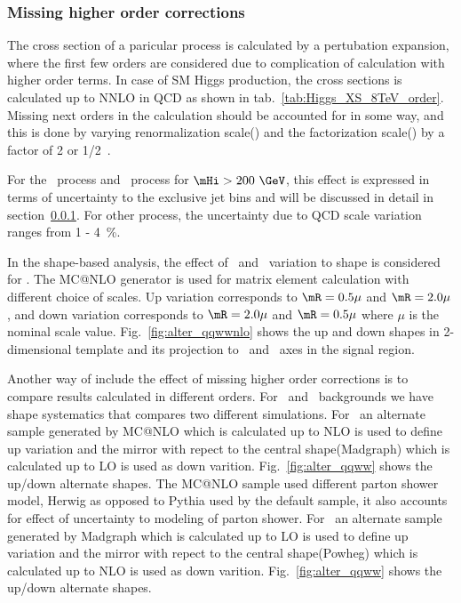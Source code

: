 \subsubsection{Missing higher order corrections} 

The cross section of a paricular process is calculated by a pertubation expansion, 
where the first few orders are considered due to complication of calculation 
with higher order terms. In case of SM Higgs production, the cross sections is calculated 
up to NNLO in QCD as shown in tab.~\ref{tab:Higgs_XS_8TeV_order}. Missing next orders 
in the calculation should be accounted for in some way, and this is done by 
varying renormalization scale(\mR) and the factorization scale(\mF) 
by a factor of 2 or 1/2~\cite{}. 

For the \ggH\ process and \qqww\ process for $\mHi>200~\GeV$, 
this effect is expressed in terms of uncertainty to the 
exclusive jet bins and will be discussed in detail in section~\ref{}. 
For other process, the uncertainty due to QCD scale variation ranges from 1 - 4~\%.   

In the shape-based analysis, the effect of \mR\ and \mF\ variation to shape 
is considered for \qqww. The MC@NLO generator is used for matrix element calculation 
with different choice of scales. Up variation corresponds to $\mR=0.5\mu$ and $\mR=2.0\mu$,
and down variation corresponds to $\mR=2.0\mu$ and $\mR=0.5\mu$ where $\mu$ is the nominal 
scale value. Fig.~\ref{fig:alter_qqwwnlo} shows the up and down  
shapes in 2-dimensional template and its projection to \mT\ and \mll\ axes
in the signal region.

Another way of include the effect of missing higher order corrections 
is to compare results calculated in different orders. For \qqww\ and \topbkg\ 
backgrounds we have shape systematics that compares two different simulations. 
For \qqww\ an alternate sample generated by MC@NLO which is calculated up to NLO
is used to define up variation 
and the mirror with repect to the central shape(Madgraph) which is calculated up to LO 
is used as down varition.
Fig.~\ref{fig:alter_qqww} shows the up/down alternate shapes. 
The MC@NLO sample used different parton shower model, Herwig as opposed to 
Pythia used by the default sample, it also accounts for effect of uncertainty 
to modeling of parton shower. 
For \topbkg\ an alternate sample generated by Madgraph which is calculated up to LO
is used to define up variation
and the mirror with repect to the central shape(Powheg) which is calculated up to NLO 
is used as down varition.
Fig.~\ref{fig:alter_qqww} shows the up/down alternate shapes. 

